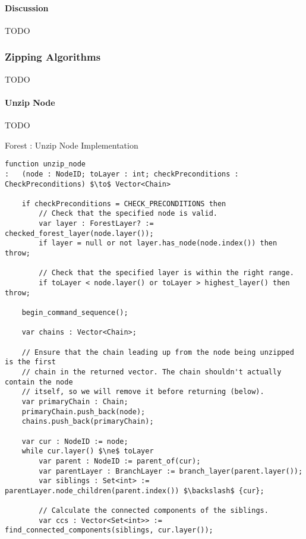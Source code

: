 \paragraph{Discussion}

TODO

\subsubsection{Zipping Algorithms}

TODO

\paragraph{Unzip Node}

TODO

\begin{stulisting}[p]
\caption{Forest : Unzip Node Implementation}
\label{code:ipfs-forest-unzipnode}
\begin{lstlisting}[style=Default]
function unzip_node
:	(node : NodeID; toLayer : int; checkPreconditions : CheckPreconditions) $\to$ Vector<Chain>

	if checkPreconditions = CHECK_PRECONDITIONS then
		// Check that the specified node is valid.
		var layer : ForestLayer? := checked_forest_layer(node.layer());
		if layer = null or not layer.has_node(node.index()) then throw;

		// Check that the specified layer is within the right range.
		if toLayer < node.layer() or toLayer > highest_layer() then throw;

	begin_command_sequence();

	var chains : Vector<Chain>;

	// Ensure that the chain leading up from the node being unzipped is the first
	// chain in the returned vector. The chain shouldn't actually contain the node
	// itself, so we will remove it before returning (below).
	var primaryChain : Chain;
	primaryChain.push_back(node);
	chains.push_back(primaryChain);

	var cur : NodeID := node;
	while cur.layer() $\ne$ toLayer
		var parent : NodeID := parent_of(cur);
		var parentLayer : BranchLayer := branch_layer(parent.layer());
		var siblings : Set<int> := parentLayer.node_children(parent.index()) $\backslash$ {cur};

		// Calculate the connected components of the siblings.
		var ccs : Vector<Set<int>> := find_connected_components(siblings, cur.layer());


\end{lstlisting}
\end{stulisting}
